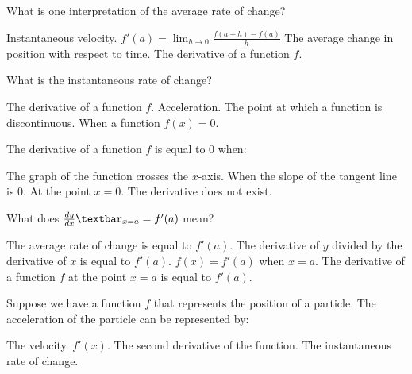 \documentclass[addpoints, 12pt]{exam}%
\newcommand{\spc}{\vspace*{0.5cm}}
\begin{document}
\begin{questions}
\spc

\question[1]
What is one interpretation of the average rate of change?

\begin{choices}
\choice Instantaneous velocity. 
\choice $f'(a) = \lim_{h \to 0} \frac{f(a + h) - f(a)}{h}$
\CorrectChoice The average change in position with respect to time. 
\choice The derivative of a function $f$.
\end{choices}

\newpage

\question[1]
What is the instantaneous rate of change?

\begin{choices}
\CorrectChoice The derivative of a function $f$.
\choice Acceleration.
\choice The point at which a function is discontinuous. 
\choice When a function $f(x) = 0$.
\end{choices}

\spc

\question[1]
The derivative of a function $f$ is equal to 0 when:

\begin{choices}
\choice The graph of the function crosses the $x$-axis.
\CorrectChoice When the slope of the tangent line is 0.
\choice At the point $x = 0$.
\choice The derivative does not exist.
\end{choices}

\spc

\question[1]
What does $\frac{dy}{dx}\textbar_{x = a} = f'(a)$ mean?

\begin{choices}
\choice The average rate of change is equal to $f'(a)$.
\choice The derivative of $y$ divided by the derivative of $x$ is equal to $f'(a)$.
\choice $f(x) = f'(a)$ when $x = a$.
\CorrectChoice The derivative of a function $f$ at the point $x = a$ is equal to $f'(a)$.
\end{choices}

\spc

\question[1]
Suppose we have a function $f$ that represents the position of a particle. The acceleration of the particle can be represented by: 

\begin{choices}
\choice The velocity.
\choice $f'(x)$.
\CorrectChoice The second derivative of the function.
\choice The instantaneous rate of change.
\end{choices}

\newpage


\end{questions}
\end{document}

